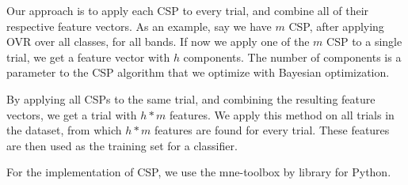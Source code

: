 Our approach is to apply each CSP to every trial, and combine all of their respective feature vectors. As an example, say we have $m$ CSP, after applying OVR over all classes, for all bands. If now we apply one of the $m$ CSP to a single trial, we get a feature vector with $h$ components. The number of components is a parameter to the CSP algorithm that we optimize with Bayesian optimization.

By applying all CSPs to the same trial, and combining the resulting feature vectors, we get a trial with $h * m$ features. We apply this method on all trials in the dataset, from which $h * m$ features are found for every trial. These features are then used as the training set for a classifier.

For the implementation of CSP, we use the mne-toolbox by \citep{gramfort2014mne} library for Python.
